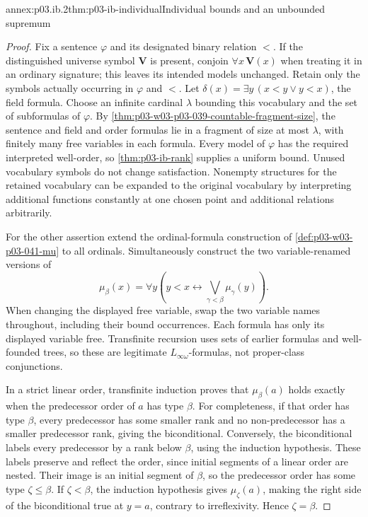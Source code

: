 \begin{annexitem}{annex:p03.ib.2}{thm:p03-ib-individual}{Individual bounds and an unbounded supremum}
\begin{proof}
Fix a sentence \(\varphi\) and its designated binary relation
\(<\). If the distinguished universe symbol \(\mathbf V\) is
present, conjoin \(\forall x\,\mathbf V(x)\) when treating it
in an ordinary signature; this leaves its intended models unchanged.
Retain only the symbols actually occurring in \(\varphi\)
and \(<\). Let
\(\delta(x)=\exists y\,(x<y\lor y<x)\), the field formula.
Choose an infinite cardinal \(\lambda\) bounding this vocabulary
and the set of subformulas of \(\varphi\). By
\cref{thm:p03-w03-p03-039-countable-fragment-size}, the sentence
and field and order formulas lie in a fragment of size at most
\(\lambda\), with finitely many free variables in each formula.
Every model of \(\varphi\) has the required interpreted
well-order, so \cref{thm:p03-ib-rank} supplies a uniform bound.
Unused vocabulary symbols do not change satisfaction. Nonempty
structures for the retained vocabulary can be expanded to the
original vocabulary by interpreting additional functions constantly
at one chosen point and additional relations arbitrarily.

For the other assertion extend the ordinal-formula construction
of \cref{def:p03-w03-p03-041-mu} to all ordinals. Simultaneously
construct the two variable-renamed versions of
\[
 \mu_\beta(x)=\forall y
       \left(y<x\leftrightarrow
                   \bigvee_{\gamma<\beta}\mu_\gamma(y)\right).
\]
When changing the displayed free variable, swap the two variable
names throughout, including their bound occurrences. Each formula
has only its displayed variable free. Transfinite recursion uses
sets of earlier formulas and well-founded trees, so these are
legitimate \(L_{\infty\omega}\)-formulas, not proper-class
conjunctions.

In a strict linear order, transfinite induction proves that
\(\mu_\beta(a)\) holds exactly when the predecessor order of
\(a\) has type \(\beta\). For completeness, if that order has
type \(\beta\), every predecessor has some smaller rank and
no non-predecessor has a smaller predecessor rank, giving the
biconditional. Conversely, the biconditional labels every
predecessor by a rank below \(\beta\), using the induction
hypothesis. These labels preserve and reflect the order, since
initial segments of a linear order are nested. Their image is
an initial segment of \(\beta\), so the predecessor order has
some type \(\zeta\leq\beta\). If \(\zeta<\beta\), the
induction hypothesis gives \(\mu_\zeta(a)\), making the
right side of the biconditional true at \(y=a\), contrary to
irreflexivity. Hence \(\zeta=\beta\).


\end{proof}
\end{annexitem}
